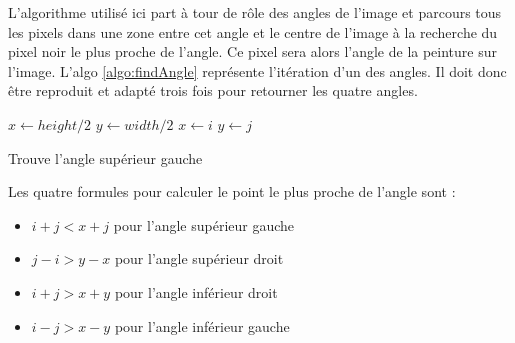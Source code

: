 \documentclass[a4paper]{article}
\begin{document}
        L'algorithme utilisé ici part à tour de rôle des angles de l'image et parcours tous les pixels dans une zone entre cet angle et le centre de l'image à la recherche du pixel noir le plus proche de l'angle. Ce pixel sera alors l'angle de la peinture sur l'image. L'algo \ref{algo:findAngle} représente l'itération d'un des angles. Il doit donc être reproduit et adapté trois fois pour retourner les quatre angles.

        \begin{algorithm}
            \begin{algorithmic}
                \STATE $x \leftarrow height / 2$
                \STATE $y \leftarrow width / 2$
                                \STATE $x \leftarrow i$
                                \STATE $y \leftarrow j$
                            \ENDIF
                        \ENDIF
                    \ENDFOR
                \ENDFOR
            \end{algorithmic}
            \caption{Trouve l'angle supérieur gauche}
            \label{algo:findAngle}
        \end{algorithm}

        Les quatre formules pour calculer le point le plus proche de l'angle sont :
        \begin{itemize}
            \item $i + j < x + j$ pour l'angle supérieur gauche
            \item $j - i > y - x$ pour l'angle supérieur droit
            \item $i + j > x + y$ pour l'angle inférieur droit
            \item $i - j > x - y$ pour l'angle inférieur gauche
        \end{itemize}
\end{document}

